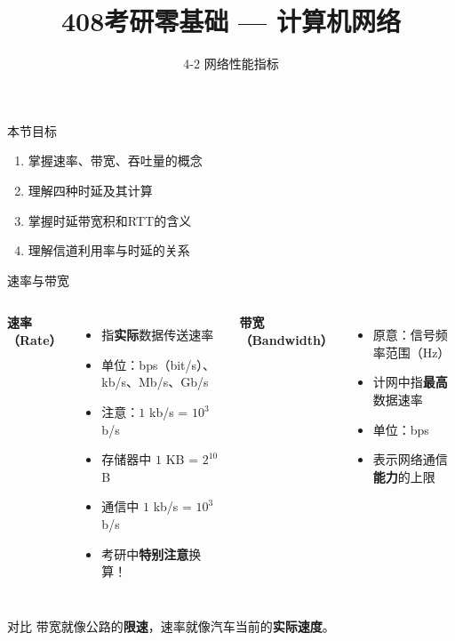 \documentclass[10pt, aspectratio=169]{beamer}
\title{408考研零基础 --- 计算机网络}
\subtitle{4-2 网络性能指标}
\author{}
\date{}
\begin{document}
\begin{frame}{本节目标}
    \begin{enumerate}
        \item 掌握速率、带宽、吞吐量的概念
        \item 理解四种时延及其计算
        \item 掌握时延带宽积和RTT的含义
        \item 理解信道利用率与时延的关系
    \end{enumerate}
\end{frame}

\begin{frame}{速率与带宽}
    \begin{columns}[T]
        \textbf{速率（Rate）}
        \begin{itemize}
            \item 指\textbf{实际}数据传送速率
            \item 单位：bps（bit/s）、kb/s、Mb/s、Gb/s
            \item 注意：$1$ kb/s = $10^3$ b/s
            \item 存储器中 $1$ KB = $2^{10}$ B
            \item 通信中 $1$ kb/s = $10^3$ b/s
            \item 考研中\textbf{特别注意}换算！
        \end{itemize}
        \textbf{带宽（Bandwidth）}
        \begin{itemize}
            \item 原意：信号频率范围（Hz）
            \item 计网中指\textbf{最高}数据速率
            \item 单位：bps
            \item 表示网络通信\textbf{能力}的上限
        \end{itemize}
    \end{columns}
    \vspace{0.5em}
    \begin{exampleblock}{对比}
        带宽就像公路的\textbf{限速}，速率就像汽车当前的\textbf{实际速度}。
    \end{exampleblock}
\end{frame}
\end{document}
